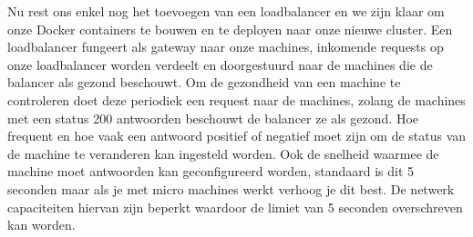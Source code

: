 \documentclass{article}
\begin{document}
	\par
	Nu rest ons enkel nog het toevoegen van een loadbalancer en we zijn klaar om onze Docker containers te bouwen en te deployen naar onze nieuwe cluster. Een loadbalancer fungeert als gateway naar onze machines, inkomende requests op onze loadbalancer worden verdeelt en doorgestuurd naar de machines die de balancer als gezond beschouwt. Om de gezondheid van een machine te controleren doet deze periodiek een request naar de machines, zolang de machines met een status 200 antwoorden beschouwt de balancer ze als gezond. Hoe frequent en hoe vaak een antwoord positief of negatief moet zijn om de status van de machine te veranderen kan ingesteld worden. Ook de snelheid waarmee de machine moet antwoorden kan geconfigureerd worden, standaard is dit 5 seconden maar als je met micro machines werkt verhoog je dit best. De netwerk capaciteiten hiervan zijn beperkt waardoor de limiet van 5 seconden overschreven kan worden.
	\par
	
\end{document}
